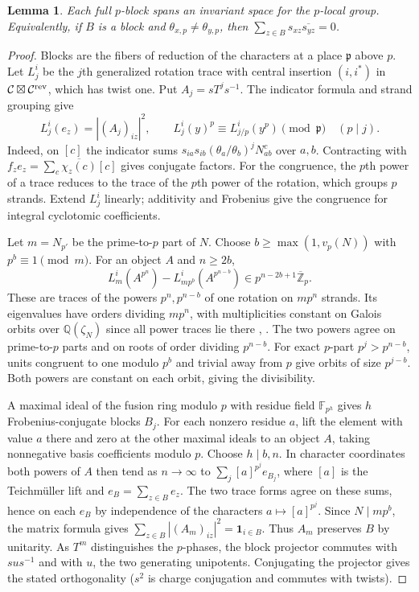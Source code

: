 \documentclass[11pt]{amsart}
\numberwithin{equation}{section}
\newtheorem{lemma}[theorem]{Lemma}
\newcommand{\QQ}{\mathbb Q}
\newcommand{\ZZ}{\mathbb Z}
\newcommand{\C}{\mathcal C}
\begin{document}
\begin{lemma}\label{blk:local}
Each full $p$-block spans an invariant space for the $p$-local group.
Equivalently, if $B$ is a block and $\theta_{x,p}\ne\theta_{y,p}$, then
$\sum_{z\in B}s_{xz}\overline{s_{yz}}=0$.
\end{lemma}
\begin{proof}
Blocks are the fibers of reduction of the characters at a place
$\mathfrak p$ above $p$. Let $L_j^i$ be the $j$th generalized rotation
trace with central insertion $(i,i^*)$ in $\C\boxtimes\C^{\rm rev}$,
which has twist one. Put $A_j=sT^js^{-1}$. The indicator formula and
strand grouping \cite[Lemmas~2.5, 2.7, Proposition~2.8, Corollary~5.5
and Proposition~6.1]{NSind} give
\[
 L_j^i(e_z)=|(A_j)_{iz}|^2,\qquad
 L_j^i(y)^p\equiv L_{j/p}^i(y^p)\pmod{\mathfrak p}\quad(p\mid j).
\]
Indeed, on $[c]$ the indicator sums
$s_{ia}s_{ib}(\theta_a/\theta_b)^jN_{ab}^c$ over $a,b$. Contracting with
$f_z e_z=\sum_c\overline{\chi_z(c)}[c]$ gives conjugate factors. For the
congruence, the $p$th power of a trace reduces to the trace of the $p$th
power of the rotation, which groups $p$ strands. Extend $L_j^i$ linearly;
additivity and Frobenius give the congruence for integral cyclotomic
coefficients.

Let $m=N_{p'}$ be the prime-to-$p$ part of $N$. Choose $b\ge\max(1,v_p(N))$
with $p^b\equiv1\pmod m$. For an object $A$ and $n\ge2b$,
\[
 L_m^i(A^{p^n})-L_{mp^b}^i(A^{p^{n-b}})\in
 p^{n-2b+1}\overline{\ZZ}_p .
\]
These are traces of the powers $p^n,p^{n-b}$ of one rotation on $mp^n$
strands. Its eigenvalues have orders dividing $mp^n$, with multiplicities
constant on Galois orbits over $\QQ(\zeta_N)$ since all power traces lie
there \cite[Proposition~5.7]{NSind}, \cite[Theorem~7.7]{NSfs}. The two
powers agree on prime-to-$p$ parts and on roots of order dividing
$p^{n-b}$. For exact $p$-part $p^j>p^{n-b}$, units congruent to one
modulo $p^b$ and trivial away from $p$ give orbits of size $p^{j-b}$.
Both powers are constant on each orbit, giving the divisibility.

A maximal ideal of the fusion ring modulo $p$ with residue field
$\mathbb F_{p^h}$ gives $h$ Frobenius-conjugate blocks $B_j$. For each
nonzero residue $a$, lift the element with value $a$ there and zero at
the other maximal ideals to an object $A$, taking nonnegative basis
coefficients modulo $p$. Choose $h\mid b,n$. In character coordinates
both powers of $A$ then tend as $n\to\infty$ to
$\sum_j[a]^{p^j}e_{B_j}$, where $[a]$ is the Teichm\"uller lift and
$e_B=\sum_{z\in B}e_z$. The two trace forms agree on these sums, hence
on each $e_B$ by independence of the characters $a\mapsto[a]^{p^j}$.
Since $N\mid mp^b$, the matrix formula gives
$\sum_{z\in B}|(A_m)_{iz}|^2=\mathbf1_{i\in B}$. Thus $A_m$ preserves
$B$ by unitarity. As $T^m$ distinguishes the $p$-phases, the block
projector commutes with $sus^{-1}$ and with $u$, the two generating
unipotents. Conjugating the projector gives the stated orthogonality
($s^2$ is charge conjugation and commutes with twists).
\end{proof}
\end{document}

